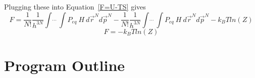 \documentclass[double,12pt]{beavtex}
\begin{document}
Plugging these into Equation~\ref{F=U-TS} gives
\begin{equation} F = \frac{1}{N!}\frac{1}{h^{3N}}\int\dot~\dot~\dot~\int P_{eq}~H~d\vec r^{N} d\vec p^{N}-\frac{1}{N!}\frac{1}{h^{3N}}\int\dot~\dot~\dot~\int P_{eq}~H~d\vec r^{N} d\vec p^{N} -k_BTln(Z)\end{equation}
\begin{equation}F = -k_BTln(Z)\end{equation}


\section{Program Outline}


\end{document}
